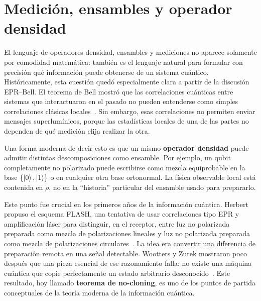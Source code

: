 \documentclass[../main.tex]{subfiles}
\begin{document}
\chapter{Medición, ensambles y \textbf{operador densidad}}


El lenguaje de operadores densidad, ensambles y mediciones no aparece solamente por comodidad matemática: también es el lenguaje natural para formular con precisión qué información puede obtenerse de un sistema cuántico. Históricamente, esta cuestión quedó especialmente clara a partir de la discusión EPR--Bell. El teorema de Bell mostró que las correlaciones cuánticas entre sistemas que interactuaron en el pasado no pueden entenderse como simples correlaciones clásicas locales~\cite{Bell1964}. Sin embargo, esas correlaciones no permiten enviar mensajes superlumínicos, porque las estadísticas locales de una de las partes no dependen de qué medición elija realizar la otra.

Una forma moderna de decir esto es que un mismo \textbf{operador densidad} puede admitir distintas descomposiciones como ensamble. Por ejemplo, un qubit completamente no polarizado puede escribirse como mezcla equiprobable en la base $\{\ket{0},\ket{1}\}$ o en cualquier otra base ortonormal. La física observable local está contenida en $\rho$, no en la ``historia'' particular del ensamble usado para prepararlo.

Este punto fue crucial en los primeros años de la información cuántica. Herbert propuso el esquema FLASH, una tentativa de usar correlaciones tipo EPR y amplificación láser para distinguir, en el receptor, entre luz no polarizada preparada como mezcla de polarizaciones lineales y luz no polarizada preparada como mezcla de polarizaciones circulares~\cite{HerbertFLASH}. La idea era convertir una diferencia de preparación remota en una señal detectable. Wootters y Zurek mostraron poco después que una pieza esencial de ese razonamiento falla: no existe una máquina cuántica que copie perfectamente un estado arbitrario desconocido~\cite{WoottersZurek1982}. Este resultado, hoy llamado \textbf{teorema de no-cloning}, es uno de los puntos de partida conceptuales de la teoría moderna de la información cuántica.
\end{document}
